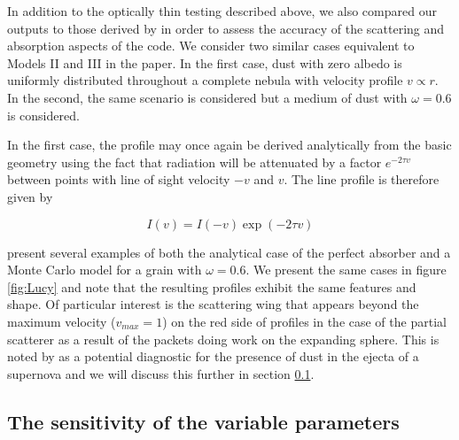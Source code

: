\documentclass[useAMS,usenatbib,usegraphicx]{mnras}
\begin{document}
In addition to the optically thin testing described above, we also 
compared our outputs to those derived by \citet{Lucy1989a} in order to 
assess the accuracy of the scattering and absorption aspects of the code.  
We consider two similar cases equivalent to Models II and III in the 
\citet{Lucy1989a} paper. In the first case, dust with zero albedo is 
uniformly distributed throughout a complete nebula with velocity profile 
$v \propto r$.  In the second, the same scenario is considered but a 
medium of dust with $\omega =0.6$ is considered.

In the first case, the profile may once again be derived analytically from 
the basic geometry using the fact that radiation will be attenuated by a 
factor $e^{-2\tau v}$ between points with line of sight velocity $-v$ and 
$v$.  The line profile is therefore given by

\[
I(v) = I(-v)\exp(-2\tau v)  
\]

\citet{Lucy1989a} present several examples of both the analytical case of 
the perfect absorber and a Monte Carlo model for a grain with $\omega 
=0.6$.  We present the same cases in figure \ref{fig:Lucy} and note that 
the resulting profiles exhibit the same features and shape. Of particular 
interest is the scattering wing that appears beyond the maximum velocity 
($v_{max}=1$) on the red side of profiles in the case of the partial 
scatterer as a result of the packets doing work on the expanding sphere.  
This is noted by \citet{Lucy1989a} as a potential diagnostic for the 
presence of dust in the ejecta of a supernova and we will discuss this 
further in section \ref{ps}.


\subsection{The sensitivity of the variable parameters}
\label{ps}
\end{document}
